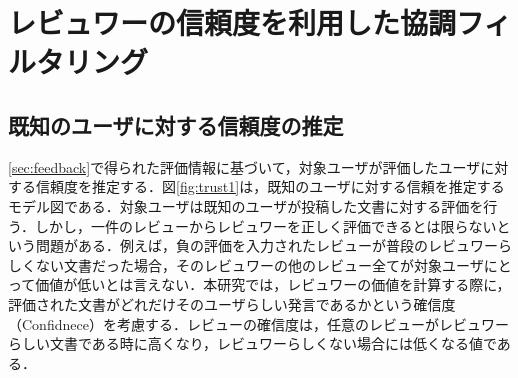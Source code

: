 \documentclass[a4paper,11pt,oneside,openany]{jsbook}
\begin{document}
	\section{レビュワーの信頼度を利用した協調フィルタリング}
		\subsection{既知のユーザに対する信頼度の推定}
\label{subsec:trust}
\ref{sec:feedback}で得られた評価情報に基づいて，対象ユーザが評価したユーザに対する信頼度を推定する．図\ref{fig:trust1}は，既知のユーザに対する信頼を推定するモデル図である．対象ユーザは既知のユーザが投稿した文書に対する評価を行う．しかし，一件のレビューからレビュワーを正しく評価できるとは限らないという問題がある．例えば，負の評価を入力されたレビューが普段のレビュワーらしくない文書だった場合，そのレビュワーの他のレビュー全てが対象ユーザにとって価値が低いとは言えない．本研究では，レビュワーの価値を計算する際に，評価された文書がどれだけそのユーザらしい発言であるかという確信度（Confidnece）を考慮する．レビューの確信度は，任意のレビューがレビュワーらしい文書である時に高くなり，レビュワーらしくない場合には低くなる値である．
\end{document}
